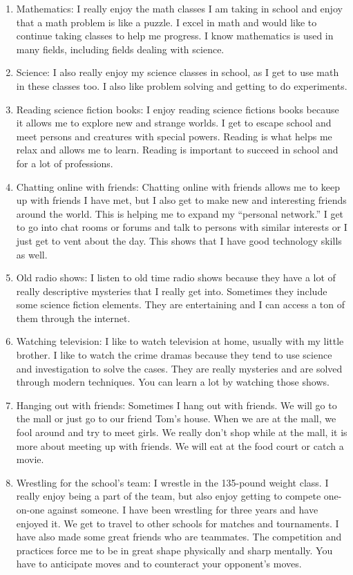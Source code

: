 \begin{enumerate}[leftmargin=*]
\item Mathematics: I really enjoy the math classes I am taking in school and enjoy that a math problem is like a puzzle. I excel in math and would like to continue taking classes to help me progress. I know mathematics is used in many fields, including fields dealing with science.
\item Science: I also really enjoy my science classes in school, as I get to use math in these classes too. I also like problem solving and getting to do experiments.
\item Reading science fiction books: I enjoy reading science fictions books because it allows me to explore new and strange worlds. I get to escape school and meet persons and creatures with special powers. Reading is what helps me relax and allows me to learn. Reading is important to succeed in school and for a lot of professions.
\item Chatting online with friends: Chatting online with friends allows me to keep up with friends I have met, but I also get to make new and interesting friends around the world. This is helping me to expand my ``personal network.'' I get to go into chat rooms or forums and talk to persons with similar interests or I just get to vent about the day. This shows that I have good technology skills as well.
\item Old radio shows: I listen to old time radio shows because they have a lot of really descriptive mysteries that I really get into. Sometimes they include some science fiction elements. They are entertaining and I can access a ton of them through the internet.
\item Watching television: I like to watch television at home, usually with my little brother. I like to watch the crime dramas because they tend to use science and investigation to solve the cases. They are really mysteries and are solved through modern techniques. You can learn a lot by watching those shows.
\item Hanging out with friends: Sometimes I hang out with friends. We will go to the mall or just go to our friend Tom's house. When we are at the mall, we fool around and try to meet girls. We really don't shop while at the mall, it is more about meeting up with friends. We will eat at the food court or catch a movie.
\item Wrestling for the school's team: I wrestle in the 135-pound weight class. I really enjoy being a part of the team, but also enjoy getting to compete one-on-one against someone. I have been wrestling for three years and have enjoyed it. We get to travel to other schools for matches and tournaments. I have also made some great friends who are teammates. The competition and practices force me to be in great shape physically and sharp mentally. You have to anticipate moves and to counteract your opponent's moves.

\end{enumerate}
